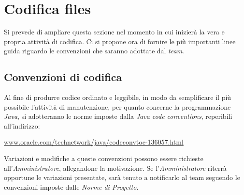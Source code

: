 \section{Codifica files}
Si prevede di ampliare questa sezione nel momento in cui inizierà la vera e propria attività di codifica.
Ci si propone ora di fornire le più importanti linee guida riguardo le convenzioni che saranno adottate dal \textit{team}.

\subsection{Convenzioni di codifica}
Al fine di produrre codice ordinato e leggibile, in modo da semplificare il più possibile l'attività di manutenzione, per quanto concerne la programmazione \textit{Java}, si adotteranno le norme imposte dalla \textit{Java code conventions}, reperibili all'indirizzo:
\begin{center}
\href{http://www.oracle.com/technetwork/java/codeconvtoc-136057.html}{www.oracle.com/technetwork/java/codeconvtoc-136057.html}
\end{center}
Variazioni e modifiche a queste convenzioni possono essere richieste all'\textit{Amministratore}, allegandone la motivazione.
Se l'\textit{Amministratore} riterrà opportune le variazioni presentate, sarà tenuto a notificarlo al team seguendo le convenzioni imposte dalle \textit{Norme di Progetto}.